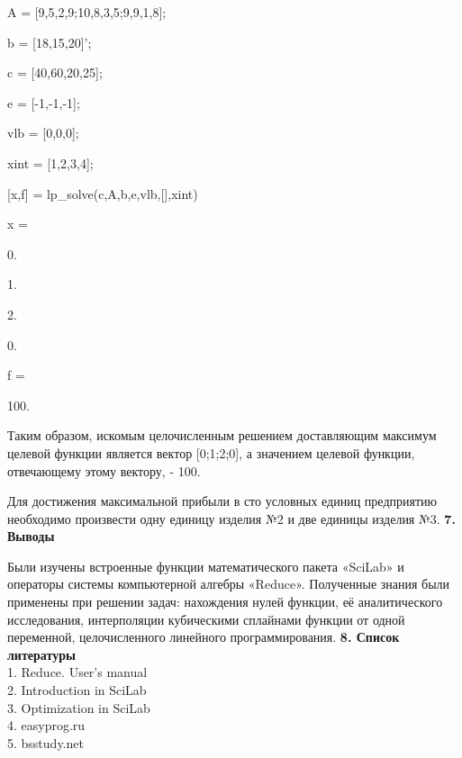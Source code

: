 \documentclass[russian,utf8,nocolumnxxxi,nocolumnxxxii]{eskdtext}
\begin{document}
A = [9,5,2,9;10,8,3,5;9,9,1,8];

b = [18,15,20]’;

c = [40,60,20,25];

e = [-1,-1,-1];

vlb = [0,0,0];

xint = [1,2,3,4];

[x,f] = lp\_solve(c,A,b,e,vlb,[],xint)

x =

0.

1.

2.

0.

f =

100.

Таким образом, искомым целочисленным решением доставляющим максимум целевой функции является вектор [0;1;2;0], а значением целевой функции, отвечающему этому вектору, - 100.

Для достижения максимальной прибыли в сто условных единиц предприятию необходимо произвести одну единицу изделия №2 и две единицы изделия №3.
\newpage
{\bf 7. Выводы}

Были изучены встроенные функции математического пакета «SciLab» и операторы системы компьютерной алгебры «Reduce». Полученные знания были применены при решении задач: нахождения нулей функции, её аналитического исследования, интерполяции кубическими сплайнами функции от одной переменной, целочисленного линейного программирования.
\newpage
{\bf8. Список литературы}
\\1. Reduce. User’s manual
\\2. Introduction in SciLab
\\3. Optimization in SciLab
\\4. easyprog.ru
\\5. bsstudy.net
\end{document}
